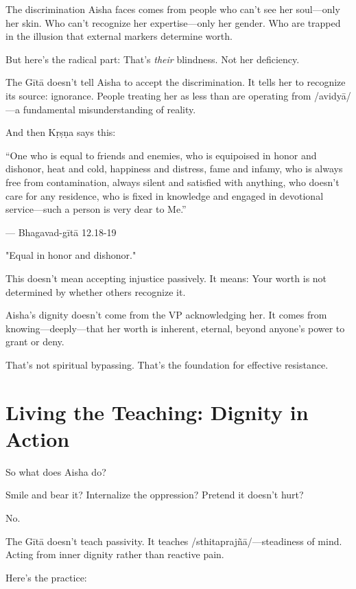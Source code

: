 \documentclass[11pt,twoside]{book}
\begin{document}
The discrimination Aisha faces comes from people who can't see her soul—only her skin. Who can't recognize her expertise—only her gender. Who are trapped in the illusion that external markers determine worth.

But here's the radical part: That's \emph{their} blindness. Not her deficiency.

The Gītā doesn't tell Aisha to accept the discrimination. It tells her to recognize its source: ignorance. People treating her as less than are operating from /avidyā/—a fundamental misunderstanding of reality.

And then Kṛṣṇa says this:

\begin{pullquote}
``One who is equal to friends and enemies, who is equipoised in honor and dishonor, heat and cold, happiness and distress, fame and infamy, who is always free from contamination, always silent and satisfied with anything, who doesn't care for any residence, who is fixed in knowledge and engaged in devotional service—such a person is very dear to Me.''

--- Bhagavad-gītā 12.18-19
\end{pullquote}

"Equal in honor and dishonor."

This doesn't mean accepting injustice passively. It means: Your worth is not determined by whether others recognize it.

Aisha's dignity doesn't come from the VP acknowledging her. It comes from knowing—deeply—that her worth is inherent, eternal, beyond anyone's power to grant or deny.

That's not spiritual bypassing. That's the foundation for effective resistance.

\section*{Living the Teaching: Dignity in Action}

So what does Aisha do?

Smile and bear it? Internalize the oppression? Pretend it doesn't hurt?

No.

The Gītā doesn't teach passivity. It teaches /sthitaprajñā/—steadiness of mind. Acting from inner dignity rather than reactive pain.

Here's the practice:
\end{document}

